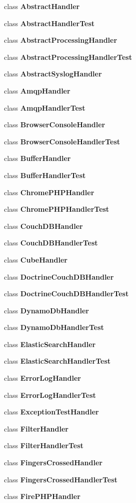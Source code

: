 \begin{DoxyCompactItemize}
\item 
class {\bf Abstract\+Handler}
\item 
class {\bf Abstract\+Handler\+Test}
\item 
class {\bf Abstract\+Processing\+Handler}
\item 
class {\bf Abstract\+Processing\+Handler\+Test}
\item 
class {\bf Abstract\+Syslog\+Handler}
\item 
class {\bf Amqp\+Handler}
\item 
class {\bf Amqp\+Handler\+Test}
\item 
class {\bf Browser\+Console\+Handler}
\item 
class {\bf Browser\+Console\+Handler\+Test}
\item 
class {\bf Buffer\+Handler}
\item 
class {\bf Buffer\+Handler\+Test}
\item 
class {\bf Chrome\+P\+H\+P\+Handler}
\item 
class {\bf Chrome\+P\+H\+P\+Handler\+Test}
\item 
class {\bf Couch\+D\+B\+Handler}
\item 
class {\bf Couch\+D\+B\+Handler\+Test}
\item 
class {\bf Cube\+Handler}
\item 
class {\bf Doctrine\+Couch\+D\+B\+Handler}
\item 
class {\bf Doctrine\+Couch\+D\+B\+Handler\+Test}
\item 
class {\bf Dynamo\+Db\+Handler}
\item 
class {\bf Dynamo\+Db\+Handler\+Test}
\item 
class {\bf Elastic\+Search\+Handler}
\item 
class {\bf Elastic\+Search\+Handler\+Test}
\item 
class {\bf Error\+Log\+Handler}
\item 
class {\bf Error\+Log\+Handler\+Test}
\item 
class {\bf Exception\+Test\+Handler}
\item 
class {\bf Filter\+Handler}
\item 
class {\bf Filter\+Handler\+Test}
\item 
class {\bf Fingers\+Crossed\+Handler}
\item 
class {\bf Fingers\+Crossed\+Handler\+Test}
\item 
class {\bf Fire\+P\+H\+P\+Handler}
\item 

\end{DoxyCompactItemize}

